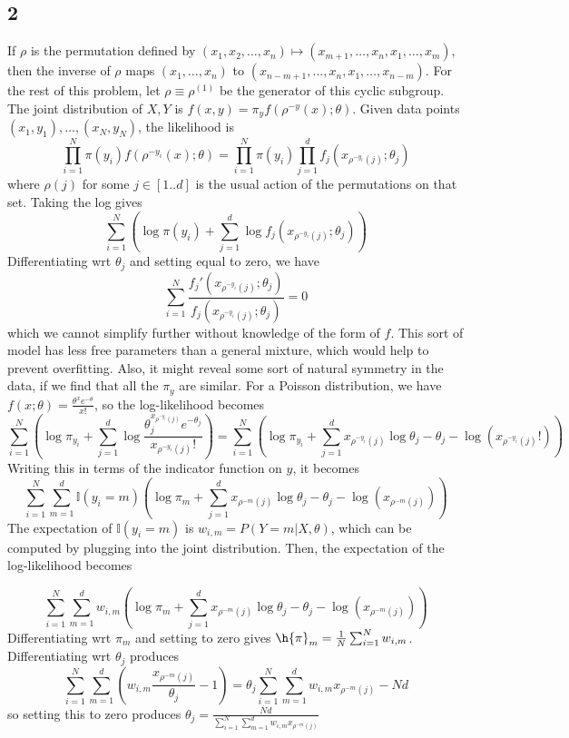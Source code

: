 \documentclass{article}
\begin{document}
\subsection*{2}
If $\rho$ is the permutation defined by $(x_1,x_2,\ldots,x_n)\mapsto(x_{m+1},\ldots,x_n,x_1,\ldots,x_m)$, then the inverse of $\rho$ maps $(x_1,\ldots,x_n)$ to $(x_{n-m+1},\ldots,x_n,x_1,\ldots,x_{n-m})$. For the rest of this problem, let $\rho\equiv\rho^{(1)}$ be the generator of this cyclic subgroup.
The joint distribution of $X,Y$ is $f(x,y)=\pi_yf(\rho^{-y}(x);\theta)$. Given data points $(x_1,y_1),\ldots,(x_N,y_N)$, the likelihood is
\[\prod_{i=1}^N\pi(y_i)f(\rho^{-y_i}(x);\theta)=\prod_{i=1}^N\pi(y_i)\prod_{j=1}^df_j(x_{\rho^{-y_i}(j)};\theta_j)\]
where $\rho(j)$ for some $j\in[1..d]$ is the usual action of the permutations on that set. Taking the log gives
\[\sum_{i=1}^N\left(\log\pi(y_i)+\sum_{j=1}^d\log f_j(x_{\rho^{-y_i}(j)};\theta_j)\right)\]
Differentiating wrt $\theta_j$ and setting equal to zero, we have
\[\sum_{i=1}^N\frac{f_j'(x_{\rho^{-y_i}(j)};\theta_j)}{f_j(x_{\rho^{-y_i}(j)};\theta_j)}=0\]
which we cannot simplify further without knowledge of the form of $f$.
This sort of model has less free parameters than a general mixture, which would help to prevent overfitting. Also, it might reveal some sort of natural symmetry in the data, if we find that all the $\pi_y$ are similar.
For a Poisson distribution, we have $f(x;\theta)=\frac{\theta^xe^{-\theta}}{x!}$, so the log-likelihood becomes
\[\sum_{i=1}^N\left(\log\pi_{y_i}+\sum_{j=1}^d\log \frac{\theta_j^{x_{\rho^{-y_i}(j)}}e^{-\theta_j}}{x_{\rho^{-y_i}(j)}!}\right)
=\sum_{i=1}^N\left(\log\pi_{y_i}+\sum_{j=1}^dx_{\rho^{-y_i}(j)}\log\theta_j-\theta_j-\log(x_{\rho^{-y_i}(j)}!)\right)\]
Writing this in terms of the indicator function on $y$, it becomes
\[\sum_{i=1}^N\sum_{m=1}^d\mathbb{I}(y_i=m)\left(\log\pi_m+\sum_{j=1}^dx_{\rho^{-m}(j)}\log\theta_j-\theta_j-\log(x_{\rho^{-m}(j)})\right)\]
The expectation of $\mathbb{I}(y_i=m)$ is $w_{i,m}=P(Y=m|X,\theta)$, which can be computed by plugging into the joint distribution. Then, the expectation of the log-likelihood becomes

\[\sum_{i=1}^N\sum_{m=1}^dw_{i,m}\left(\log\pi_m+\sum_{j=1}^dx_{\rho^{-m}(j)}\log\theta_j-\theta_j-\log(x_{\rho^{-m}(j)})\right)\]
Differentiating wrt $\pi_m$ and setting to zero gives $\h{\pi}_m=\frac{1}{N}\sum_{i=1}^Nw_{i,m}$. Differentiating wrt $\theta_j$ produces
\[\sum_{i=1}^N\sum_{m=1}^d\left(w_{i,m}\frac{x_{\rho^{-m}(j)}}{\theta_j}-1\right)=\theta_j\sum_{i=1}^N\sum_{m=1}^dw_{i,m}x_{\rho^{-m}(j)}-Nd\]
so setting this to zero produces $\theta_j=\frac{Nd}{\sum_{i=1}^N\sum_{m=1}^dw_{i,m}x_{\rho^{-m}(j)}}$
\end{document}

